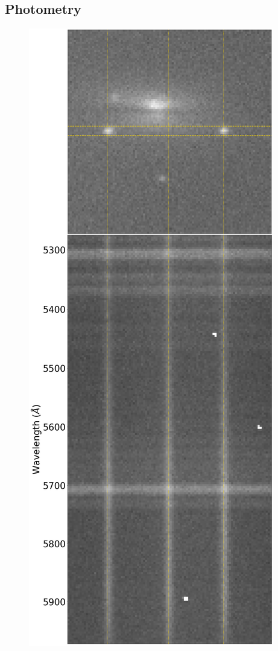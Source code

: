 \documentclass[a4paper,oneside,12pt, class=Latex/Classes/PhDthesisPSnPDF, crop=false]{standalone}
\begin{document}
\subsection{Photometry}
\begin{figure}
    \centering
    \includegraphics[height=0.8\textheight]{../Images/chapter_2/phot_and_spec_example.png}

\end{figure}
\end{document}
